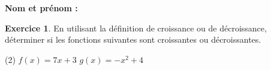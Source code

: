\documentclass{article}
\theoremstyle{definition}
\newtheorem{exercice}{Exercice}
\begin{document}
\pagestyle{fancy}
\fancyhf{} %
\fancyhead[L]{\large \textbf{\Niveau}}
\fancyhead[C]{\large \textbf{\ChapitreCourt}}
\large

\textbf{Nom et prénom :}\dotfill

\begin{exercice}
  En utilisant la définition de croissance ou de décroissance, déterminer si les fonctions suivantes sont croissantes ou décroissantes.
  \begin{tasks}(2)
    \task $f(x)=7x+3$
    \task $g(x)=-x^2+4$
  \end{tasks}
  \begin{center}
  \end{center}
\end{exercice}
\end{document}
